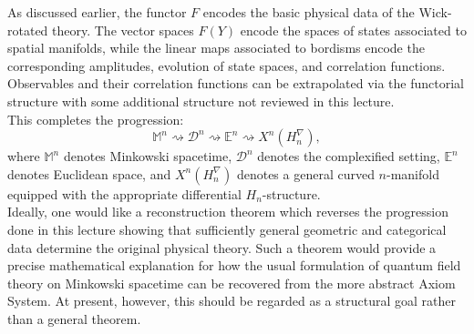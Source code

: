 \documentclass[a4paper,11pt]{article}
\begin{document}
As discussed earlier, the functor $F$ encodes the basic physical data of the
Wick-rotated theory. The vector spaces $F(Y)$ encode the spaces of
states associated to spatial manifolds, while the linear maps associated to bordisms encode the corresponding amplitudes, evolution of state spaces, and correlation functions. Observables and their correlation functions can be extrapolated via the functorial structure with some additional structure not reviewed in this lecture.\\

This completes the progression:
\[
\mathbb{M}^n
\rightsquigarrow
\mathcal{D}^n
\rightsquigarrow
\mathbb{E}^n
\rightsquigarrow
X^n(H_n^\nabla),
\]
where $\mathbb{M}^n$ denotes Minkowski spacetime, $\mathcal{D}^n$ denotes the complexified setting, $\mathbb{E}^n$ denotes Euclidean space, and $X^n(H_n^\nabla)$ denotes a general curved $n$-manifold equipped with the appropriate differential $H_n$-structure.\\

Ideally, one would like a reconstruction theorem which reverses the progression done in this lecture  showing that sufficiently general geometric and categorical data determine the original physical theory. Such a theorem would provide a precise mathematical explanation for how the usual formulation of quantum field theory on Minkowski spacetime can be recovered from the more abstract Axiom System. At present, however, this should be regarded as a structural goal rather than a general theorem.
\end{document}

